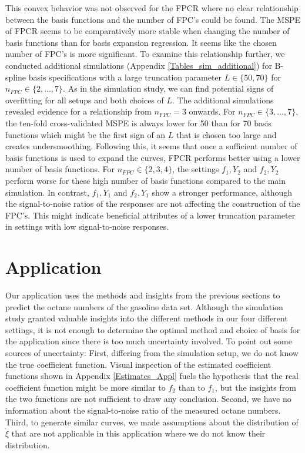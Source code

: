 \documentclass[11pt,twoside,a4paper]{article}
\begin{document}
	This convex behavior was not observed for the FPCR where no clear relationship between the basis functions and the number of FPC's could be found. The MSPE of FPCR seems to be comparatively more stable when changing the number of basis functions than for basis expansion regression. It seems like the chosen number of FPC's is more significant. To examine this relationship further, we conducted additional simulations (Appendix \ref{Tables_sim_additional}) for B-spline basis specifications with a large truncation parameter $L \in \{50, 70\}$ for $n_{FPC} \in \{2, \dots, 7 \}$. As in the simulation study, we can find potential signs of overfitting for all setups and both choices of $L$. The additional simulations revealed evidence for a relationship from $n_{FPC} = 3$ onwards. For $n_{FPC} \in \{3, \dots, 7 \}$, the ten-fold cross-validated MSPE is always lower for 50 than for 70 basis functions which might be the first sign of an $L$ that is chosen too large and creates undersmoothing. Following this, it seems that once a sufficient number of basis functions is used to expand the curves, FPCR performs better using a lower number of basis functions. For $n_{FPC} \in \{2, 3, 4 \}$, the settings $f_1,Y_2$ and $f_2,Y_2$ perform worse for these high number of basis functions compared to the main simulation. In contrast, $f_1,Y_1$ and $f_2,Y_1$ show a stronger performance, although the signal-to-noise ratios of the responses are not affecting the construction of the FPC's. This might indicate beneficial attributes of a lower truncation parameter in settings with low signal-to-noise responses.
	
	\section{Application}\label{Application}
		Our application uses the methods and insights from the previous sections to predict the octane numbers of the gasoline data set.
		Although the simulation study granted valuable insights into the different methods in our four different settings, it is not enough to determine the optimal method and choice of basis for the application since there is too much uncertainty involved. To point out some sources of uncertainty: First, differing from the simulation setup, we do not know the true coefficient function. Visual inspection of the estimated coefficient functions shown in Appendix \ref{Estimates_Appl} fuels the hypothesis that the real coefficient function might be more similar to $f_2$ than to $f_1$, but the insights from the two functions are not sufficient to draw any conclusion. Second, we have no information about the signal-to-noise ratio of the measured octane numbers. Third, to generate similar curves, we made assumptions about the distribution of $\mathring{\xi}$ that are not applicable in this application where we do not know their distribution.
		 
\end{document}
